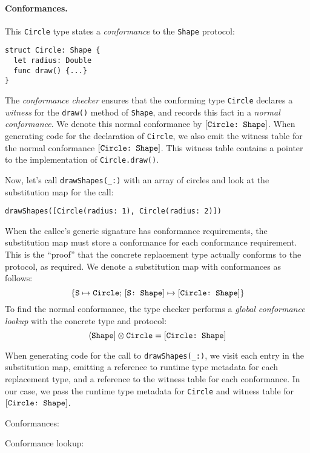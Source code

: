 \documentclass[../generics]{subfiles}
\begin{document}
\paragraph{Conformances.} This \texttt{Circle} type states a \emph{conformance} to the \texttt{Shape} protocol:
\begin{Verbatim}
struct Circle: Shape {
  let radius: Double
  func draw() {...}
}
\end{Verbatim}
The \emph{conformance checker} ensures that the conforming type \texttt{Circle} declares a \emph{witness} for the \texttt{draw()} method of \texttt{Shape}, and records this fact in a \emph{normal conformance}. We denote this normal conformance by $[\texttt{Circle:~Shape}]$. When generating code for the declaration of \texttt{Circle}, we also emit the witness table for the normal conformance $[\texttt{Circle:~Shape}]$. This witness table contains a pointer to the implementation of \texttt{Circle.draw()}.

Now, let's call \verb|drawShapes(_:)| with an array of circles and look at the substitution map for the call:
\begin{Verbatim}
drawShapes([Circle(radius: 1), Circle(radius: 2)])
\end{Verbatim}
When the callee's generic signature has conformance requirements, the substitution map must store a conformance for each conformance requirement. This is the ``proof'' that the concrete replacement type actually conforms to the protocol, as required. We denote a substitution map with conformances as follows:
\[\{\texttt{S} \mapsto \texttt{Circle};\,[\texttt{S:~Shape}] \mapsto [\texttt{Circle:~Shape}]\}\]
To find the normal conformance, the type checker performs a \emph{global conformance lookup} with the concrete type and protocol:
\[\langle\texttt{Shape}]\otimes\texttt{Circle}=[\texttt{Circle:~Shape}]\]

When generating code for the call to \verb|drawShapes(_:)|, we visit each entry in the substitution map, emitting a reference to runtime type metadata for each replacement type, and a reference to the witness table for each conformance. In our case, we pass the runtime type metadata for \texttt{Circle} and witness table for $[\texttt{Circle:~Shape}]$.

\begin{MoreDetails}
\item Conformances: 
\item Conformance lookup: 
\end{MoreDetails}
\end{document}

